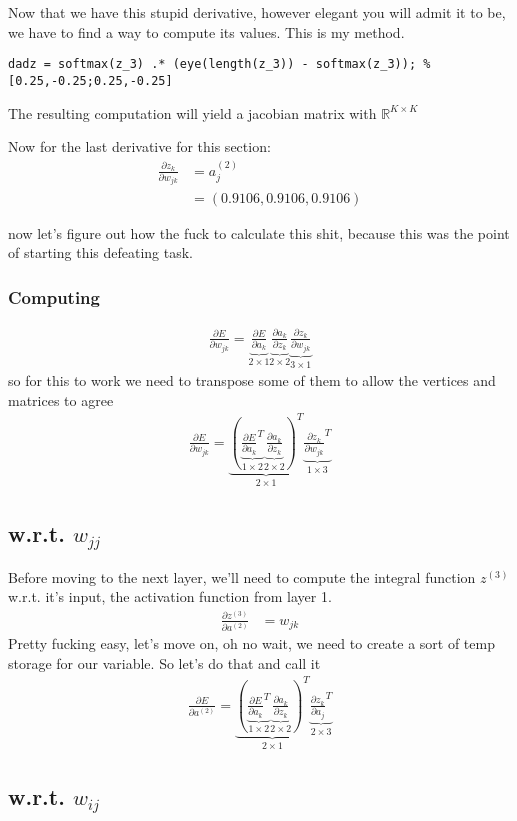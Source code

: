 \documentclass{article}
\begin{document}
Now that we have this stupid derivative, however elegant you will admit it to be, we have to find a way to  compute its values. This is my method.
\begin{lstlisting}[style=matlab, label=your-label]
dadz = softmax(z_3) .* (eye(length(z_3)) - softmax(z_3)); %[0.25,-0.25;0.25,-0.25]
\end{lstlisting}
The resulting computation will yield a jacobian matrix with $\mathbb{R}^{K\times K}$

Now for the last derivative for this section:
\begin{align*}
\frac{\partial z_k}{\partial w_{jk}} &= a^{(2)}_j\\
&= (0.9106,0.9106,0.9106)
\end{align*}

now let's figure out how the fuck to calculate this shit, because this was the point of starting this defeating task.

\subsubsection{Computing}
\begin{align}
    \frac{\partial E}{\partial w_{jk}} = \underbrace{\frac{\partial E}{\partial a_k}}_{2\times 1} \underbrace{\frac{\partial a_k}{\partial z_k}}_{2\times 2} \underbrace{\frac{\partial z_k}{\partial w_{jk}}}_{3\times 1}
\end{align}
so for this to work we need to transpose some of them to allow the vertices and matrices to agree
\begin{align}
    \frac{\partial E}{\partial w_{jk}} = \underbrace{\left( \underbrace{\frac{\partial E}{\partial a_k}^T}_{1\times 2} \underbrace{\frac{\partial a_k}{\partial z_k}}_{2\times 2}\right)^T}_{2\times 1} \underbrace{\frac{\partial z_k}{\partial w_{jk}}^T}_{1\times 3}
\end{align}


\subsection{w.r.t. $w_{jj}$}
Before moving to the next layer, we'll need to compute the integral function $z^{(3)}$ w.r.t. it's input, the activation function from layer 1.
\begin{align}
    \frac{\partial z^{(3)}}{\partial a^{(2)}} &= w_{jk} 
\end{align}
Pretty fucking easy, let's move on, oh no wait, we need to create a sort of temp storage for our variable. So let's do that and call it
\begin{align}
    \frac{\partial E}{\partial a^{(2)}} =  \underbrace{\left(\underbrace{\frac{\partial E}{\partial a_k}^T}_{1\times 2} \underbrace{\frac{\partial a_k}{\partial z_k}}_{2\times 2}\right)^T}_{2\times 1} \underbrace{\frac{\partial z_k}{\partial a_{j}}^T}_{2\times 3}
\end{align}

\subsection{w.r.t. $w_{ij}$}
\end{document}
